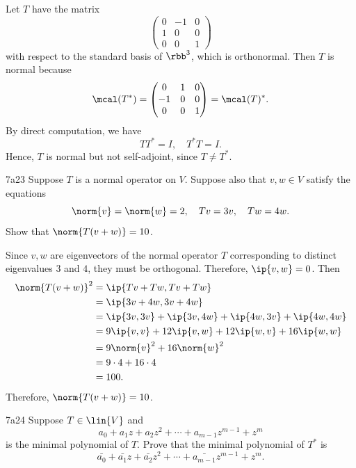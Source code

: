 \begin{sol}
    Let $T$ have the matrix
    \[
        \begin{pmatrix}
            0 & -1 & 0 \\
            1 & 0 & 0 \\
            0 & 0 & 1
        \end{pmatrix}
    \]
    with respect to the standard basis of $\rbb^3$, which is orthonormal.
    Then $T$ is normal because
    \[
        \mcal(T^\ast) = 
        \begin{pmatrix}
            0 & 1 & 0 \\
            -1 & 0 & 0 \\
            0 & 0 & 1
        \end{pmatrix}
        = \mcal(T)^\ast.
    \]
    By direct computation, we have
    \[
        TT^\ast = I, \quad T^\ast T = I.
    \]
    Hence, $T$ is normal but not self-adjoint, since $T \neq T^\ast$.
\end{sol}

\begin{exercise}{7a23}
    Suppose $T$ is a normal operator on $V$.
    Suppose also that $v, w \in V$ satisfy the equations
    \[
        \norm{v} = \norm{w} = 2, \quad Tv = 3v, \quad Tw = 4w.
    \]
    Show that $\norm{T(v + w)} = 10$.
\end{exercise}

\begin{sol}
    Since $v, w$ are eigenvectors of the normal operator $T$ corresponding to distinct eigenvalues $3$ and $4$, they must be orthogonal.
    Therefore, $\ip{v, w} = 0$.
    Then
    \begin{align*}
        \norm{T(v + w)}^2 &= \ip{Tv + Tw, Tv + Tw} \\
        &= \ip{3v + 4w, 3v + 4w} \\
        &= \ip{3v, 3v} + \ip{3v, 4w} + \ip{4w, 3v} + \ip{4w, 4w} \\
        &= 9\ip{v, v} + 12\ip{v, w} + 12\ip{w, v} + 16\ip{w, w} \\
        &= 9\norm{v}^2 + 16\norm{w}^2 \\
        &= 9 \cdot 4 + 16 \cdot 4 \\
        &= 100.
    \end{align*}
    Therefore, $\norm{T(v + w)} = 10$.
\end{sol}

\begin{exercise}{7a24}
    Suppose $T \in \lin{V}$ and
    \[
        a_0 + a_1 z + a_2 z^2 + \cdots + a_{m-1} z^{m-1} + z^m
    \]
    is the minimal polynomial of $T$.
    Prove that the minimal polynomial of $T^\ast$ is
    \[
        \bar{a_0} + \bar{a_1} z + \bar{a_2} z^2 + \cdots + \bar{a_{m-1}} z^{m-1} + z^m.
    \]
\end{exercise}

